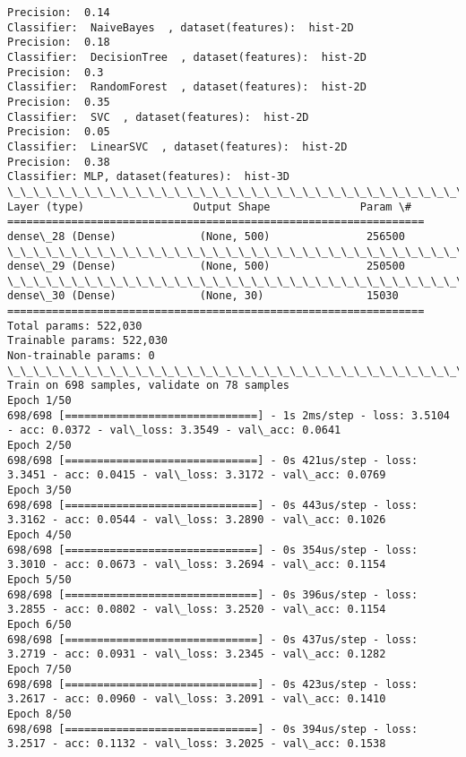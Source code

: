 \documentclass[11pt]{article}
\begin{document}
    \begin{Verbatim}[commandchars=\\\{\}]
Precision:  0.14
Classifier:  NaiveBayes  , dataset(features):  hist-2D
Precision:  0.18
Classifier:  DecisionTree  , dataset(features):  hist-2D
Precision:  0.3
Classifier:  RandomForest  , dataset(features):  hist-2D
Precision:  0.35
Classifier:  SVC  , dataset(features):  hist-2D
Precision:  0.05
Classifier:  LinearSVC  , dataset(features):  hist-2D
Precision:  0.38
Classifier: MLP, dataset(features):  hist-3D
\_\_\_\_\_\_\_\_\_\_\_\_\_\_\_\_\_\_\_\_\_\_\_\_\_\_\_\_\_\_\_\_\_\_\_\_\_\_\_\_\_\_\_\_\_\_\_\_\_\_\_\_\_\_\_\_\_\_\_\_\_\_\_\_\_
Layer (type)                 Output Shape              Param \#   
=================================================================
dense\_28 (Dense)             (None, 500)               256500    
\_\_\_\_\_\_\_\_\_\_\_\_\_\_\_\_\_\_\_\_\_\_\_\_\_\_\_\_\_\_\_\_\_\_\_\_\_\_\_\_\_\_\_\_\_\_\_\_\_\_\_\_\_\_\_\_\_\_\_\_\_\_\_\_\_
dense\_29 (Dense)             (None, 500)               250500    
\_\_\_\_\_\_\_\_\_\_\_\_\_\_\_\_\_\_\_\_\_\_\_\_\_\_\_\_\_\_\_\_\_\_\_\_\_\_\_\_\_\_\_\_\_\_\_\_\_\_\_\_\_\_\_\_\_\_\_\_\_\_\_\_\_
dense\_30 (Dense)             (None, 30)                15030     
=================================================================
Total params: 522,030
Trainable params: 522,030
Non-trainable params: 0
\_\_\_\_\_\_\_\_\_\_\_\_\_\_\_\_\_\_\_\_\_\_\_\_\_\_\_\_\_\_\_\_\_\_\_\_\_\_\_\_\_\_\_\_\_\_\_\_\_\_\_\_\_\_\_\_\_\_\_\_\_\_\_\_\_
Train on 698 samples, validate on 78 samples
Epoch 1/50
698/698 [==============================] - 1s 2ms/step - loss: 3.5104 - acc: 0.0372 - val\_loss: 3.3549 - val\_acc: 0.0641
Epoch 2/50
698/698 [==============================] - 0s 421us/step - loss: 3.3451 - acc: 0.0415 - val\_loss: 3.3172 - val\_acc: 0.0769
Epoch 3/50
698/698 [==============================] - 0s 443us/step - loss: 3.3162 - acc: 0.0544 - val\_loss: 3.2890 - val\_acc: 0.1026
Epoch 4/50
698/698 [==============================] - 0s 354us/step - loss: 3.3010 - acc: 0.0673 - val\_loss: 3.2694 - val\_acc: 0.1154
Epoch 5/50
698/698 [==============================] - 0s 396us/step - loss: 3.2855 - acc: 0.0802 - val\_loss: 3.2520 - val\_acc: 0.1154
Epoch 6/50
698/698 [==============================] - 0s 437us/step - loss: 3.2719 - acc: 0.0931 - val\_loss: 3.2345 - val\_acc: 0.1282
Epoch 7/50
698/698 [==============================] - 0s 423us/step - loss: 3.2617 - acc: 0.0960 - val\_loss: 3.2091 - val\_acc: 0.1410
Epoch 8/50
698/698 [==============================] - 0s 394us/step - loss: 3.2517 - acc: 0.1132 - val\_loss: 3.2025 - val\_acc: 0.1538

\end{Verbatim}
\end{document}
